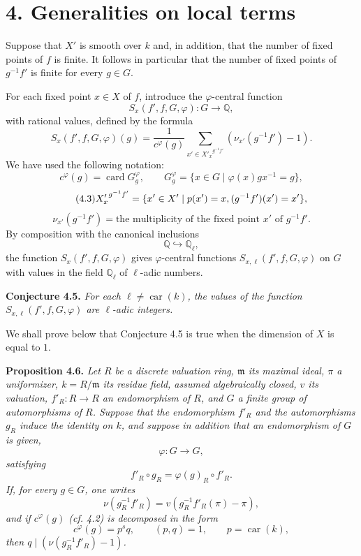 \documentclass[11pt]{article}
\providecommand{\fm}{\mathfrak{m}}
\providecommand{\car}{\operatorname{car}}
\providecommand{\car}{\operatorname{car}}
\providecommand{\bQ}{\mathbb Q}
\providecommand{\fm}{\mathfrak m}
\providecommand{\card}{\operatorname{card}}
\providecommand{\car}{\operatorname{car}}
\begin{document}
\section*{4. Generalities on local terms}
Suppose that $X'$ is smooth over $k$ and, in addition, that the number of fixed points of $f$ is finite. It follows in particular that the number of fixed points of $g^{-1}f'$ is finite for every $g\in G$.

For each fixed point $x\in X$ of $f$, introduce the $\varphi$-central function
\[
S_x(f',f,G,\varphi):G\longrightarrow \bQ,
\]
with rational values, defined by the formula
\begin{equation}\tag{4.1}
S_x(f',f,G,\varphi)(g)=
\frac{1}{c^\varphi(g)}
\sum_{x'\in {X'_x}^{g^{-1}f'}}(\nu_{x'}(g^{-1}f')-1).
\end{equation}
We have used the following notation:
\begin{equation}\tag{4.2}
c^\varphi(g)=\card G_g^\varphi,
\qquad
G_g^\varphi=\{x\in G\mid \varphi(x)gx^{-1}=g\},
\end{equation}
\begin{equation}\tag{4.3}
{X'_x}^{g^{-1}f'}=\{x'\in X'\mid p(x')=x,\\ (g^{-1}f')(x')=x'\},
\end{equation}
\begin{equation}\tag{4.4}
\nu_{x'}(g^{-1}f')=\text{the multiplicity of the fixed point }x'\text{ of }g^{-1}f'.
\end{equation}
By composition with the canonical inclusions
\[
\bQ\hookrightarrow \bQ_\ell,
\]
the function $S_x(f',f,G,\varphi)$ gives $\varphi$-central functions $S_{x,\ell}(f',f,G,\varphi)$ on $G$ with values in the field $\bQ_\ell$ of $\ell$-adic numbers.

\medskip
\noindent
\textbf{Conjecture 4.5.} \emph{For each $\ell\ne\car(k)$, the values of the function $S_{x,\ell}(f',f,G,\varphi)$ are $\ell$-adic integers.}

\medskip
We shall prove below that Conjecture 4.5 is true when the dimension of $X$ is equal to $1$.

\medskip
\noindent
\textbf{Proposition 4.6.} \emph{Let $R$ be a discrete valuation ring, $\fm$ its maximal ideal, $\pi$ a uniformizer, $k=R/\fm$ its residue field, assumed algebraically closed, $v$ its valuation, $f'_R:R\to R$ an endomorphism of $R$, and $G$ a finite group of automorphisms of $R$. Suppose that the endomorphism $f'_R$ and the automorphisms $g_R$ induce the identity on $k$, and suppose in addition that an endomorphism of $G$ is given,
\[
\varphi:G\longrightarrow G,
\]
satisfying
\[
f'_R\circ g_R=\varphi(g)_R\circ f'_R.
\]
If, for every $g\in G$, one writes
\[
\nu(g_R^{-1}f'_R)=v(g_R^{-1}f'_R(\pi)-\pi),
\]
and if $c^\varphi(g)$ (cf. 4.2) is decomposed in the form
\[
c^\varphi(g)=p^sq,
\qquad (p,q)=1,
\qquad p=\car(k),
\]
then $q\mid(\nu(g_R^{-1}f'_R)-1)$.}
\end{document}
